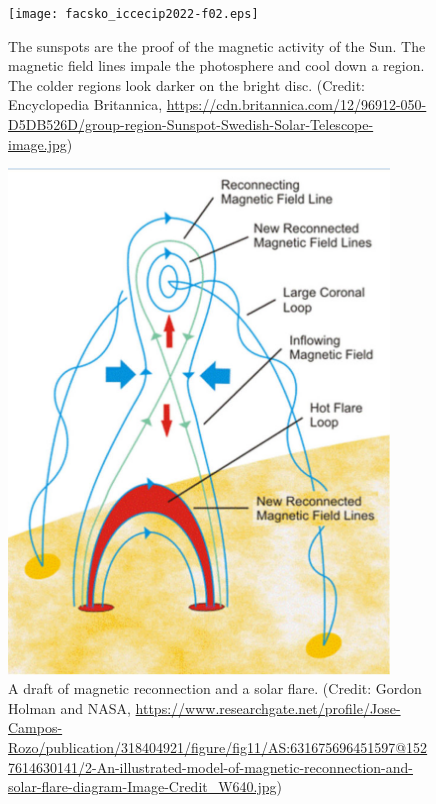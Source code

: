 \documentclass[sn-aps]{sn-jnl}%
\begin{document}
\begin{figure}[t]
\centering
\texttt{[image: facsko\_iccecip2022-f02.eps]}
\caption{The sunspots are the proof of the magnetic activity of the Sun. The magnetic field lines impale the photosphere and cool down a region. The colder regions look darker on the bright disc. (Credit: Encyclopedia Britannica, \url{https://cdn.britannica.com/12/96912-050-D5DB526D/group-region-Sunspot-Swedish-Solar-Telescope-image.jpg})}\label{fig:sunspot}
\end{figure}


\begin{figure}[t]
\centering
\includegraphics[width=0.9\textwidth]{facsko_iccecip2022-f03.eps}
\caption{A draft of magnetic reconnection and a solar flare. (Credit: Gordon Holman and NASA, \url{https://www.researchgate.net/profile/Jose-Campos-Rozo/publication/318404921/figure/fig11/AS:631675696451597@1527614630141/2-An-illustrated-model-of-magnetic-reconnection-and-solar-flare-diagram-Image-Credit_W640.jpg})}\label{fig:reconnection}
\end{figure}
\end{document}
